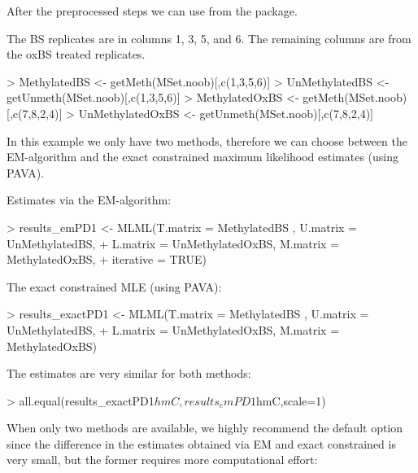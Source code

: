 \documentclass{article}
\begin{document}
After the preprocessed steps we can use  from the  package.


The BS replicates are in columns 1, 3, 5, and 6. The remaining columns are from the oxBS treated replicates.

\begin{Schunk}
\begin{Sinput}
> MethylatedBS <- getMeth(MSet.noob)[,c(1,3,5,6)]
> UnMethylatedBS <- getUnmeth(MSet.noob)[,c(1,3,5,6)]
> MethylatedOxBS <- getMeth(MSet.noob)[,c(7,8,2,4)]
> UnMethylatedOxBS <- getUnmeth(MSet.noob)[,c(7,8,2,4)]
\end{Sinput}
\end{Schunk}





In this example we only have two methods, therefore we can choose between the EM-algorithm and the exact constrained maximum likelihood estimates (using PAVA).

Estimates via the EM-algorithm:

\begin{Schunk}
\begin{Sinput}
> results_emPD1 <- MLML(T.matrix = MethylatedBS , U.matrix = UnMethylatedBS,
+                    L.matrix = UnMethylatedOxBS, M.matrix = MethylatedOxBS,
+                    iterative = TRUE)
\end{Sinput}
\end{Schunk}




The exact constrained MLE (using PAVA):

\begin{Schunk}
\begin{Sinput}
> results_exactPD1 <- MLML(T.matrix = MethylatedBS , U.matrix = UnMethylatedBS,
+                       L.matrix = UnMethylatedOxBS, M.matrix = MethylatedOxBS)
\end{Sinput}
\end{Schunk}

The estimates are very similar for both methods:
\begin{Schunk}
\begin{Sinput}
> all.equal(results_exactPD1$hmC,results_emPD1$hmC,scale=1)
\end{Sinput}
\end{Schunk}

When only two methods are available, we highly recommend the default option  since the difference in the estimates obtained via EM and exact constrained is very small, but the former requires more computational effort:
\end{document}
